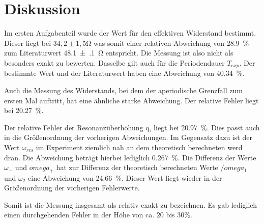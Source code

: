 \section{Diskussion}
\label{sec:Diskussion}

Im ersten Aufgabenteil wurde der Wert für den effektiven Widerstand bestimmt. Dieser liegt bei $34,2 \pm 1,5$\si{\ohm} was somit einer relativen Abweichung von \SI{28.9}{\percent} zum Literaturwert \SI{48.1(1)}{\ohm} entspricht. Die Messung ist also nicht als besonders exakt zu bewerten. Dasselbe gilt auch für die Periodendauer $T_{exp}$. Der bestimmte Wert und der Literaturwert haben eine Abweichung von \SI{40.34}{\percent}.

Auch die Messung des Widerstands, bei dem der aperiodische Grenzfall zum ersten Mal auftritt, hat eine ähnliche starke Abweichung. Der relative Fehler liegt bei \SI{20.27}{\percent}.

Der relative Fehler der Resonanzüberhöhung q, liegt bei \SI{20.97}{\percent}. Dies passt auch in die Größenordnung der vorherigen Abweichungen. Im Gegensatz dazu ist der Wert $\omega_{res}$ im Experiment ziemlich nah an dem theoretisch berechneten werd dran. Die Abweichung beträgt hierbei lediglich \SI{0.267}{\percent}. Die Differenz der Werte $\omega_{-}$ und $omega_{+}$ hat zur Differenz der theoretisch berechneten Werte $/omega_{1}$ und $\omega_{2}$ eine Abweichung von \SI{24.66}{\percent}. Dieser Wert liegt wieder in der Größenordnung der vorherigen Fehlerwerte. 

Somit ist die Messung insgesamt als relativ exakt zu bezeichnen. Es gab lediglich einen durchgehenden Fehler in der Höhe von ca. $20$ bis $30 \si{\percent}$.  

